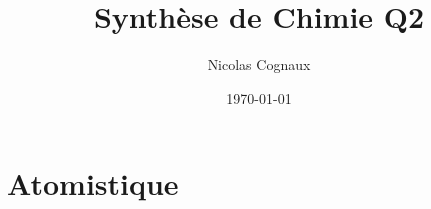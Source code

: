 \documentclass[11pt,a4paper,french]{article}
\title{Synthèse de Chimie Q2}
\author{Nicolas Cognaux}
\date{\today}
\begin{document}
\maketitle
\part{Atomistique}
\end{document}
